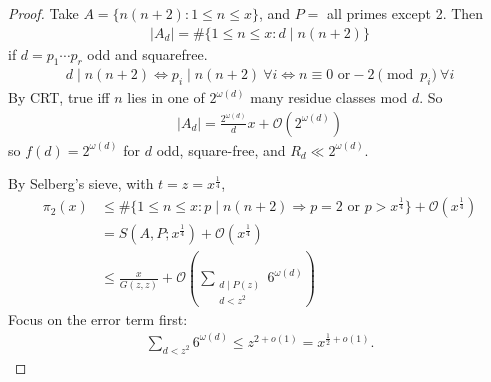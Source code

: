 \documentclass{article}
\newcommand{\1}{\mathbbm{1}}
\newcommand{\bigO}{\mathcal{O}}
\begin{document}
\begin{proof}
  Take $A = \{n(n+2) : 1 \leq n \leq x\}$, and $P=$ all primes except 2.
  Then
  \begin{align*}
    |A_d| = \#\{1 \leq n \leq x : d \mid n(n+2)\}
  \end{align*}
  if $d = p_1 \dotsm p_r$ odd and squarefree.
  \begin{align*}
    d \mid n(n+2) \iff p_i \mid n(n+2) \ \forall i \iff n \equiv 0 \text{ or} -2 \pmod{p_i} \ \forall i
  \end{align*}
  By CRT, true iff $n$ lies in one of $2^{\omega(d)}$ many residue classes mod $d$. So
  \begin{align*}
    |A_d| = \frac{2^{\omega(d)}}{d} x + \bigO(2^{\omega(d)})
  \end{align*}
  so $f(d) = 2^{\omega(d)}$ for $d$ odd, square-free, and $R_d \ll 2^{\omega(d)}$.

  By Selberg's sieve, with $t = z = x^{\frac{1}{4}}$,
  \begin{align*}
    \pi_2(x) &\leq \# \{1 \leq n \leq x : p \mid n(n+2) \Rightarrow p = 2 \text{ or } p > x^{\frac 14}\} + \bigO(x^{\frac{1}4}) \\
             &= S(A,P; x^{\frac{1}{4}}) + \bigO(x^{\frac 14}) \\
             &\leq \frac{x}{G(z,z)} + \bigO(\sum_{\substack{d \mid P(z) \\ d < z^2}} 6^{\omega(d)})
  \end{align*}
  Focus on the error term first:
  \begin{align*}
    \sum_{d < z^2} 6^{\omega(d)} \leq z^{2 + o(1)} = x^{\frac{1}{2} + o(1)}.
  \end{align*}


\end{proof}
\end{document}

